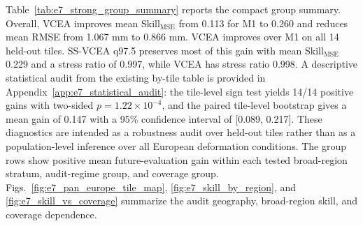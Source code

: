\documentclass[lettersize,journal]{IEEEtran}
\newcommand{\skillmse}{Skill$_{\mathrm{MSE}}$}
\begin{document}
Table~\ref{tab:e7_strong_group_summary} reports the compact group summary. Overall, VCEA improves mean \skillmse{} from 0.113 for M1 to 0.260 and reduces mean RMSE from 1.067 mm to 0.866 mm. VCEA improves over M1 on all 14 held-out tiles. SS-VCEA q97.5 preserves most of this gain with mean \skillmse{} 0.229 and a stress ratio of 0.997, while VCEA has stress ratio 0.998. A descriptive statistical audit from the existing by-tile table is provided in Appendix~\ref{app:e7_statistical_audit}: the tile-level sign test yields 14/14 positive gains with two-sided $p=1.22\times10^{-4}$, and the paired tile-level bootstrap gives a mean gain of 0.147 with a 95\% confidence interval of [0.089, 0.217]. These diagnostics are intended as a robustness audit over held-out tiles rather than as a population-level inference over all European deformation conditions. The group rows show positive mean future-evaluation gain within each tested broad-region stratum, audit-regime group, and coverage group. Figs.~\ref{fig:e7_pan_europe_tile_map}, \ref{fig:e7_skill_by_region}, and \ref{fig:e7_skill_vs_coverage} summarize the audit geography, broad-region skill, and coverage dependence.
\end{document}
